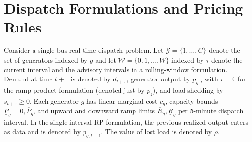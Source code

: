 \documentclass[conference]{IEEEtran}
\begin{document}
\section{Dispatch Formulations and Pricing Rules}
\label{sec:models}
Consider a single-bus real-time dispatch problem. Let $\mathcal{G}=\{1,\dots,G\}$ denote the set of generators indexed by $g$ and let $\mathcal{W}=\{0,1,\dots,W\}$ indexed by $\tau$ denote the current interval and the advisory intervals in a rolling-window formulation. Demand at time $t+\tau$ is denoted by $d_{t+\tau}$, generator output by $p_{g,t}$ with $\tau=0$ for the ramp-product formulation (denoted just by $p_g$), and load shedding by $s_{t+\tau}\ge 0$. Each generator $g$ has linear marginal cost $c_g$, capacity bounds $\underline P_g=0,\overline P_g$, and upward and downward ramp limits $\overline{R}_g,\underline{R}_g$ per 5-minute dispatch interval. In the single-interval RP formulation, the previous realized output enters as data and is denoted by $p_{g,t-1}$. The value of lost load is denoted by $\rho$.
\end{document}
